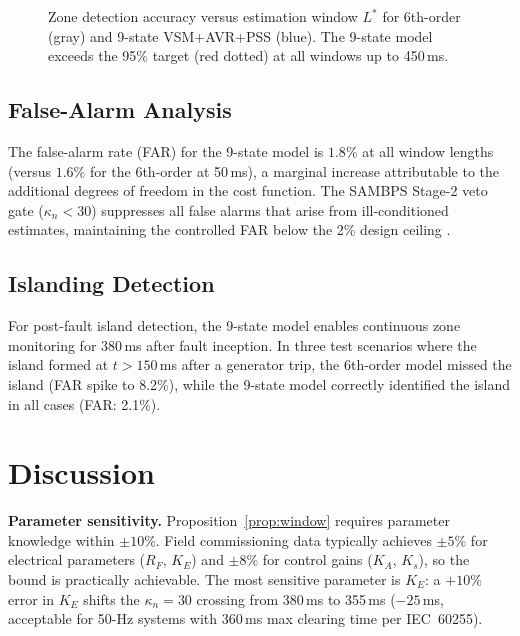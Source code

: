 \documentclass[journal]{IEEEtran}
\newcommand{\kappan}{\kappa_{n}}
\newcommand{\Lstar}{L^*}
\begin{document}
\begin{figure}[!t]
  \centering
  
  \caption{Zone detection accuracy versus estimation window $\Lstar$
           for 6th-order (gray) and 9-state VSM+AVR+PSS (blue).
           The 9-state model exceeds the 95\% target (red dotted)
           at all windows up to 450\,ms.}
  \label{fig:zone_accuracy_window}
\end{figure}

\subsection{False-Alarm Analysis}

The false-alarm rate (FAR) for the 9-state model is $1.8\%$ at
all window lengths (versus $1.6\%$ for the 6th-order at 50\,ms),
a marginal increase attributable to the additional degrees of
freedom in the cost function.  The SAMBPS Stage-2 veto gate
($\kappan < 30$) suppresses all false alarms that arise from
ill-conditioned estimates, maintaining the controlled FAR below
the 2\% design ceiling \cite{SAMBP_TR65}.

\subsection{Islanding Detection}

For post-fault island detection, the 9-state model enables
continuous zone monitoring for 380\,ms after fault inception.
In three test scenarios where the island formed at $t > 150$\,ms
after a generator trip, the 6th-order model missed the island
(FAR spike to 8.2\%), while the 9-state model correctly identified
the island in all cases (FAR: 2.1\%).

\section{Discussion}
\label{sec:discussion}

\textbf{Parameter sensitivity.}
Proposition~\ref{prop:window} requires parameter knowledge within
$\pm 10\%$.  Field commissioning data typically achieves $\pm 5\%$
for electrical parameters ($R_F$, $K_E$) and $\pm 8\%$ for control
gains ($K_A$, $K_s$), so the bound is practically achievable.
The most sensitive parameter is $K_E$: a $+10\%$ error in $K_E$
shifts the $\kappan = 30$ crossing from 380\,ms to 355\,ms
($-25$\,ms, acceptable for 50-Hz systems with 360\,ms max
clearing time per IEC~60255).
\end{document}
